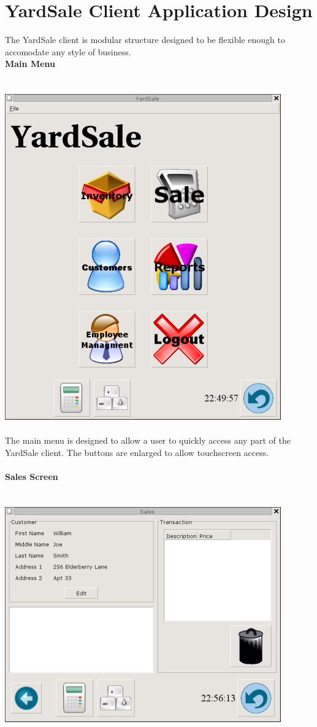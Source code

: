 \documentclass{report}
\begin{document}
    \section{YardSale Client Application Design}
The YardSale client is modular structure designed to be flexible enough to accomodate any style of business.\\
{\bf Main Menu}\\
\\
\\
\includegraphics{ys_main_screener.png}\\
\\
The main menu is designed to allow a user to quickly access any part of the YardSale client.  The buttons are
enlarged to allow touchscreen access.\\
\\
{\bf Sales Screen}\\
\\
\\
\includegraphics{ys_sales_screener.png}\\
\end{document}
